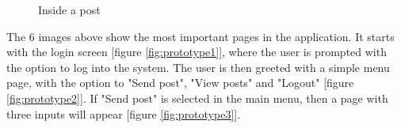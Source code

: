 \begin{table}[H]
\begin{minipage}{.33\textwidth}
\begin{figure}[H]
            \caption{Inside a post}
            \label{fig:prototype6}
        \end{figure}
    \end{minipage}
    \label{fig:prototype}
\end{table}

The 6 images above show the most important pages in the application. It starts with the login screen [figure \ref{fig:prototype1}], where the user is prompted with the option to log into the system. The user is then greeted with a simple menu page, with the option to "Send post", "View posts" and "Logout" [figure \ref{fig:prototype2}]. If "Send post" is selected in the main menu, then a page with three inputs will appear [figure \ref{fig:prototype3}].